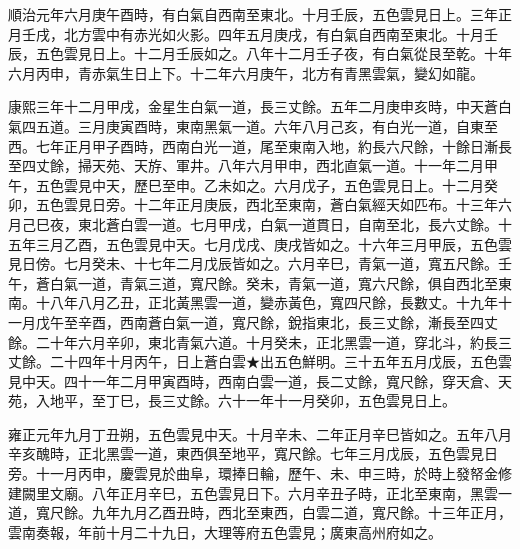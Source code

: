 \begin{pinyinscope}
順治元年六月庚午酉時，有白氣自西南至東北。十月壬辰，五色雲見日上。三年正月壬戌，北方雲中有赤光如火影。四年五月庚戌，有白氣自西南至東北。十月壬辰，五色雲見日上。十二月壬辰如之。八年十二月壬子夜，有白氣從艮至乾。十年六月丙申，青赤氣生日上下。十二年六月庚午，北方有青黑雲氣，變幻如龍。

康熙三年十二月甲戌，金星生白氣一道，長三丈餘。五年二月庚申亥時，中天蒼白氣四五道。三月庚寅酉時，東南黑氣一道。六年八月己亥，有白光一道，自東至西。七年正月甲子酉時，西南白光一道，尾至東南入地，約長六尺餘，十餘日漸長至四丈餘，掃天苑、天斿、軍井。八年六月甲申，西北直氣一道。十一年二月甲午，五色雲見中天，歷巳至申。乙未如之。六月戊子，五色雲見日上。十二月癸卯，五色雲見日旁。十二年正月庚辰，西北至東南，蒼白氣經天如匹布。十三年六月己巳夜，東北蒼白雲一道。七月甲戌，白氣一道貫日，自南至北，長六丈餘。十五年三月乙酉，五色雲見中天。七月戊戌、庚戌皆如之。十六年三月甲辰，五色雲見日傍。七月癸未、十七年二月戊辰皆如之。六月辛巳，青氣一道，寬五尺餘。壬午，蒼白氣一道，青氣三道，寬尺餘。癸未，青氣一道，寬六尺餘，俱自西北至東南。十八年八月乙丑，正北黃黑雲一道，變赤黃色，寬四尺餘，長數丈。十九年十一月戊午至辛酉，西南蒼白氣一道，寬尺餘，銳指東北，長三丈餘，漸長至四丈餘。二十年六月辛卯，東北青氣六道。十月癸未，正北黑雲一道，穿北斗，約長三丈餘。二十四年十月丙午，日上蒼白雲★出五色鮮明。三十五年五月戊辰，五色雲見中天。四十一年二月甲寅酉時，西南白雲一道，長二丈餘，寬尺餘，穿天倉、天苑，入地平，至丁巳，長三丈餘。六十一年十一月癸卯，五色雲見日上。

雍正元年九月丁丑朔，五色雲見中天。十月辛未、二年正月辛巳皆如之。五年八月辛亥醜時，正北黑雲一道，東西俱至地平，寬尺餘。七年三月戊辰，五色雲見日旁。十一月丙申，慶雲見於曲阜，環捧日輪，歷午、未、申三時，於時上發帑金修建闕里文廟。八年正月辛巳，五色雲見日下。六月辛丑子時，正北至東南，黑雲一道，寬尺餘。九年九月乙酉丑時，西北至東西，白雲二道，寬尺餘。十三年正月，雲南奏報，年前十月二十九日，大理等府五色雲見；廣東高州府如之。


\end{pinyinscope}
